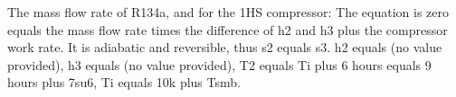 The mass flow rate of R134a, and for the 1HS compressor:
The equation is zero equals the mass flow rate times the difference of h2 and h3 plus the compressor work rate.
It is adiabatic and reversible, thus s2 equals s3.
h2 equals (no value provided),
h3 equals (no value provided),
T2 equals Ti plus 6 hours equals 9 hours plus 7su6,
Ti equals 10k plus Tsmb.